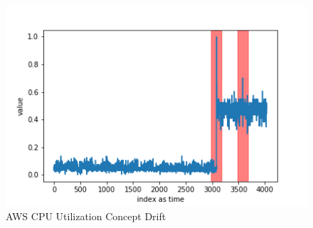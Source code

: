 \documentclass[12pt]{article}
\begin{document}
\begin{figure}[H]
\centering
        \includegraphics[width=\textwidth]{images/dataAnomalies/aws/rds_cpu_utilization_cc0c53.png}
    \caption{AWS CPU Utilization Concept Drift}
    \label{awsCpuUtilizationConceptDrift}
\end{figure}
\end{document}
